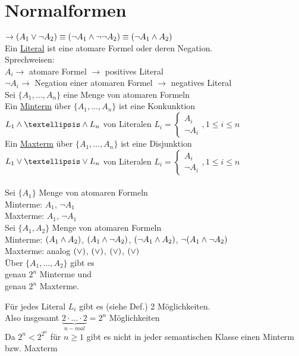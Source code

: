 \section{Normalformen}

\beispiel{}
$\rightarrow (A_1 \vee \neg A_2 ) \equiv ( \neg A_1 \wedge \neg \neg A_2) \equiv ( \neg A_1 \wedge A_2)$\\

Ein \underline{Literal} ist eine atomare Formel oder deren Negation. \\

\noindent
Sprechweisen:\\
$A_i \rightarrow$ atomare Formel $\rightarrow$ positives Literal\\
$\neg A_i \rightarrow$ Negation einer atomaren Formel $\rightarrow$ negatives Literal\\

 Sei $\{A_1, …, A_n\}$ eine Menge von atomaren Formeln\\

\noindent
Ein \underline{Minterm} über $\{A_1, …, A_n\}$ ist eine Konkunktion \\
$L_1 \AND … \AND L_n$ von Literalen $L_i = \begin{cases} A_i \\ \neg A_i \end{cases} , 1 \leq i \leq n$\\
Ein \underline{Maxterm} über $\{A_1, …, A_n\}$ ist eine Disjunktion\\
$L_1 \OR … \OR L_n$ von Literalen $L_i = \begin{cases} A_i \\ \neg A_i \end{cases} , 1 \leq i \leq n$\\

\beispiel{}\\
Sei $\{A_1\}$ Menge von atomaren Formeln\\
Minterme: $A_1$, $\neg A_1$\\
Maxterme: $A_1$, $\neg A_1$\\

\noindent
Sei $\{ A_1, A_2 \}$ Menge von atomaren Formeln\\
Minterme: $(A_1 \wedge A_2)$, $(A_1 \wedge \neg A_2)$, $(\neg A_1 \wedge A_2)$, $\neg ( A_1 \wedge \neg A_2)$\\
Maxterme: analog $( \vee )$, $( \vee )$, $( \vee )$, $( \vee )$\\

Über $\{A_1, …, A_2\}$ gibt es \\
genau $2^n$ Minterme und\\
genau $2^n$ Maxterme.

\beweis{}
Für jedes Literal $L_i$ gibt es (siehe Def.) 2 Möglichkeiten.\\
Also insgesamt $\underbrace{2 \cdot … \cdot 2}_{n-mal} = 2^n$ Möglichkeiten\\

\bemerkung{}
Da $2^n < 2^{2^n}$ für $n \geq 1$ gibt es nicht in jeder semantischen Klasse einen Minterm bzw. Maxterm

